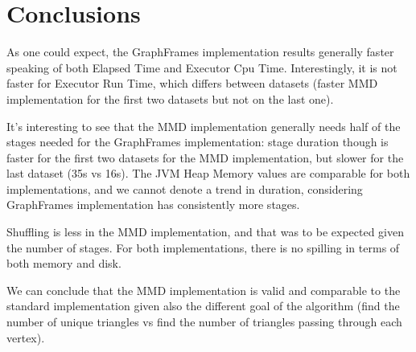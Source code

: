 \documentclass[a4paper,11pt, twoside]{article}
\begin{document}
    \section{Conclusions}\label{conclusion}

    As one could expect, the GraphFrames implementation results generally faster speaking of both Elapsed Time and Executor Cpu Time. Interestingly, it is not faster for Executor Run Time, which differs between datasets (faster MMD implementation for the first two datasets but not on the last one).

    It's interesting to see that the MMD implementation generally needs half of the stages needed for the GraphFrames implementation: stage duration though is faster for the first two datasets for the MMD implementation, but slower for the last dataset (35s vs 16s). The JVM Heap Memory values are comparable for both implementations, and we cannot denote a trend in duration, considering GraphFrames implementation has consistently more stages. 

    Shuffling is less in the MMD implementation, and that was to be expected given the number of stages. For both implementations, there is no spilling in terms of both memory and disk. 

    We can conclude that the MMD implementation is valid and comparable to the standard implementation given also the different goal of the algorithm (find the number of unique triangles vs find the number of triangles passing through each vertex).
    
    \newpage
    \printbibheading
        \printbibliography[nottype=misc]
    \printbibliography[type=misc,heading=subbibliography,title={Online Reources}]
\end{document}
